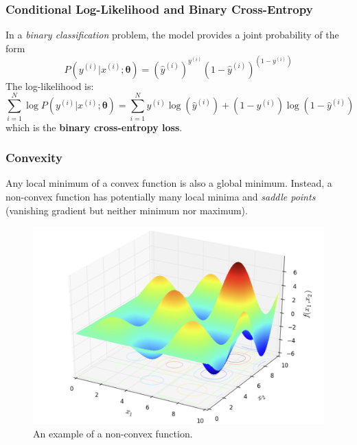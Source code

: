 \documentclass{beamer}
\begin{document}
	\begin{frame}
	\frametitle{Conditional Log-Likelihood and Binary Cross-Entropy}
	In a \textit{binary classification} problem, the model provides a joint probability of the form
	$$P(y^{(i)} | x^{(i)}; \bm{\theta}) = (\hat{y}^{(i)})^{y^{(i)}} (1-\hat{y}^{(i)})^{(1-{y}^{(i)})}$$
	The log-likelihood is:
	$$\sum_{i=1}^{N}\log P(y^{(i)} | x^{(i)}; \bm{\theta}) = \sum_{i=1}^{N}y^{(i)}\log(\hat{y}^{(i)}) + (1-{y}^{(i)})\log(1-\hat{y}^{(i)})$$
	which is the \textbf{binary cross-entropy loss}.
\end{frame}

	\begin{frame}
		\frametitle{Convexity}
		Any local minimum of a convex function is also a global minimum. 
		Instead, a non-convex function has potentially many local minima and \textit{saddle points} (vanishing gradient but neither minimum nor maximum).
		
		\begin{figure}
			\centering
			\includegraphics[scale=0.25]{images/non_convex}
			\caption{An example of a non-convex function.}
		\end{figure}
		
	\end{frame}
\end{document}
